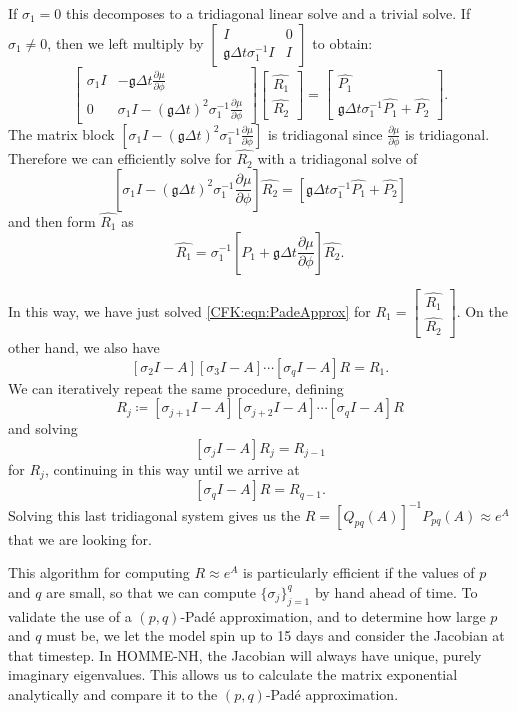 \documentclass{csri19}
\newcommand{\CFKg}{\mathfrak{g}}
\begin{document}
If $\sigma_1 = 0$ this decomposes to a tridiagonal linear solve and a trivial solve. 
If $\sigma_1 \neq 0$, then we left multiply by $\begin{bmatrix} I & 0 \\
                                     \CFKg\Delta t \sigma_1^{-1}I & I \end{bmatrix}$ to obtain:
\[\begin{bmatrix} 
 \sigma_1 I  & -\CFKg\Delta t \frac{\partial\mu}{\partial\phi} \\
         0 & \sigma_1 I -\left(\CFKg\Delta t\right)^2  \sigma_1^{-1}\frac{\partial\mu}{\partial\phi}
 \end{bmatrix}
 \begin{bmatrix} \hat{R_1} \\
 \hat{R_2} \end{bmatrix} = 
\begin{bmatrix} \hat{P_1} \\
 \CFKg\Delta t \sigma_1^{-1} \hat{P_1} +  \hat{P_2} \end{bmatrix}.\]
The matrix block $\left[\sigma_1 I -\left(\CFKg\Delta t\right)^2\sigma_1^{-1}\frac{\partial\mu}{\partial\phi}\right]$ 
is tridiagonal since $\frac{\partial\mu}{\partial\phi}$ is tridiagonal. 
Therefore we can efficiently solve for $\hat{R_2}$ with a tridiagonal 
solve of 
\[\left[\sigma_1 I -\left(\CFKg\Delta t \right)^2  \sigma_1^{-1}\frac{\partial\mu}{\partial\phi}\right]\hat{R_2}
 = \left[\CFKg\Delta t\sigma_1^{-1} \hat{P_1} +  \hat{P_2}\right]\]
and then form $\hat{R_1}$ as 
\[\hat{R_1} = \sigma_1^{-1}\left[P_1 + \CFKg\Delta t\frac{\partial \mu}{\partial \phi}\right] \hat{R_2}.\]

In this way, we have just solved \ref{CFK:eqn:PadeApprox} for $R_1 = \begin{bmatrix} \hat{R_1}\\ \hat{R_2}\end{bmatrix}$. 
On the other hand, we also have
\[\left[\sigma_2I-A\right]\left[\sigma_3I-A\right]\cdots\left[\sigma_qI-A\right]R = R_1.\] 
We can iteratively repeat the same procedure, defining 
\[R_j \coloneqq \left[\sigma_{j+1}I-A\right]\left[\sigma_{j+2}I-A\right]\cdots\left[\sigma_qI-A\right]R\]
 and solving 
\[\left[\sigma_jI-A\right]R_j = R_{j-1}\] for $R_j$, continuing 
in this way until we arrive at \[\left[\sigma_qI-A\right]R = R_{q-1}.\] 
Solving this last tridiagonal system gives us the $R = \left[Q_{pq}(A)\right]^{-1}P_{pq}(A)\approx e^A$
 that we are looking for.

This algorithm for computing $R \approx e^A$ is particularly efficient if 
the values of $p$ and $q$ are small, so that we can compute $\{\sigma_j\}_
{j=1}^q$ by hand ahead of time. To validate the use of a $(p,q)$-Pad\'e 
approximation, and to determine how large $p$ and $q$ must be, we let the 
model spin up to 15 days and consider the Jacobian at that timestep. In 
HOMME-NH, the Jacobian will always have unique, purely imaginary 
eigenvalues. This allows us to calculate the matrix exponential 
analytically and compare it to the $(p,q)$-Pad\'e approximation.
\end{document}
